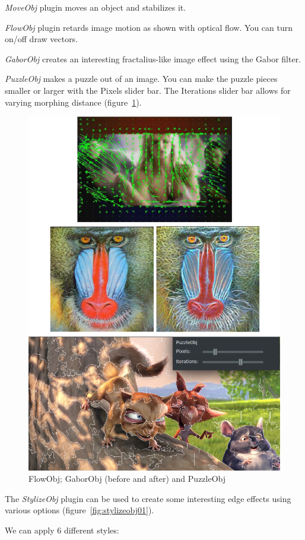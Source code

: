 \textit{MoveObj} plugin moves an object and stabilizes it.

\textit{FlowObj} plugin retards image motion as shown with optical flow. You can turn on/off draw vectors.

\textit{GaborObj} creates an interesting fractalius-like image effect using the Gabor filter.

\textit{PuzzleObj} makes a puzzle out of an image. You can make the puzzle pieces smaller or larger with the Pixels slider bar. The Iterations slider bar allows for varying morphing distance (figure~\ref{fig:opencv}).

\begin{figure}[htpb]
    \centering
    \includegraphics[width=0.8\linewidth]{images/opencv.png}
    \caption{FlowObj; GaborObj (before and after) and PuzzleObj}
    \label{fig:opencv}
\end{figure}

The \textit{StylizeObj} plugin can be used to create some interesting edge effects using various options (figure~\ref{fig:stylizeobj01}).

We can apply 6 different styles:

